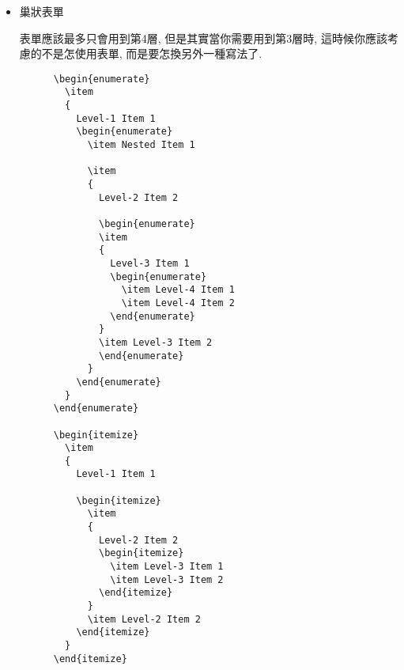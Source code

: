 \begin{itemize}
  \newpage
  \item
  {
    巢狀表單

    表單應該最多只會用到第4層, 但是其實當你需要用到第3層時, 這時候你應該考慮的不是怎使用表單, 而是要怎換另外一種寫法了.\\

    \begin{DescriptionFrame}
    \begin{verbatim}
      \begin{enumerate}
        \item
        {
          Level-1 Item 1
          \begin{enumerate}
            \item Nested Item 1

            \item
            {
              Level-2 Item 2

              \begin{enumerate}
              \item
              {
                Level-3 Item 1
                \begin{enumerate}
                  \item Level-4 Item 1
                  \item Level-4 Item 2
                \end{enumerate}
              }
              \item Level-3 Item 2
              \end{enumerate}
            }
          \end{enumerate}
        }
      \end{enumerate}

      \begin{itemize}
        \item
        {
          Level-1 Item 1

          \begin{itemize}
            \item
            {
              Level-2 Item 2
              \begin{itemize}
                \item Level-3 Item 1
                \item Level-3 Item 2
              \end{itemize}
            }
            \item Level-2 Item 2
          \end{itemize}
        }
      \end{itemize}
    \end{verbatim}
    \end{DescriptionFrame}

}
\end{itemize}
